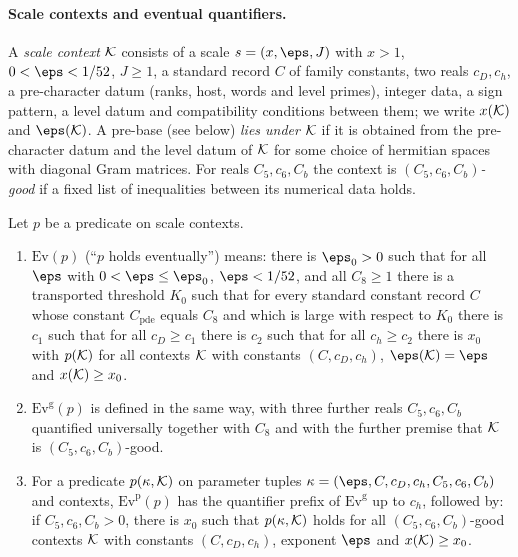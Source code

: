 \paragraph{Scale contexts and eventual quantifiers.}
A \emph{scale context} $\mathcal K$ consists of a scale $s=(x,\eps,J)$ with $x>1$, $0<\eps<1/52$, $J\ge1$, a standard record $C$
of family constants, two reals $c_D,c_h$, a pre-character datum (ranks, host, words and level primes), integer data, a sign
pattern, a level datum and compatibility conditions between them; we write $x(\mathcal K)$ and $\eps(\bundK)$. A pre-base (see
below) \emph{lies under} $\mathcal K$ if it is obtained from the pre-character datum and the level datum of $\mathcal K$ for some
choice of hermitian spaces with diagonal Gram matrices. For reals $C_5,c_6,C_b$ the context is \emph{$(C_5,c_6,C_b)$-good} if
a fixed list of inequalities between its numerical data holds.

\begin{definition}\label{pf:bundles:def:ev}
Let $p$ be a predicate on scale contexts.
\begin{enumerate}[label=(\alph*)]
\item $\mathrm{Ev}(p)$ (``$p$ holds eventually'') means: there is $\eps_0>0$ such that for all $\eps$ with $0<\eps\le\eps_0$,
$\eps<1/52$, and all $C_8\ge1$ there is a transported threshold $K_0$ such that for every standard constant record $C$ whose
constant $C_{\mathrm{pde}}$ equals $C_8$ and which is large with respect to $K_0$ there is $c_1$ such that for all $c_D\ge c_1$
there is $c_2$ such that for all $c_h\ge c_2$ there is $x_0$ with $p(\mathcal K)$ for all contexts $\mathcal K$ with constants
$(C,c_D,c_h)$, $\eps(\bundK)=\eps$ and $x(\mathcal K)\ge x_0$.
\item $\mathrm{Ev}^{\mathrm g}(p)$ is defined in the same way, with three further reals $C_5,c_6,C_b$ quantified universally
together with $C_8$ and with the further premise that $\mathcal K$ is $(C_5,c_6,C_b)$-good.
\item For a predicate $p(\kappa,\mathcal K)$ on parameter tuples $\kappa=(\eps,C,c_D,c_h,C_5,c_6,C_b)$ and contexts,
$\mathrm{Ev}^{\mathrm p}(p)$ has the quantifier prefix of $\mathrm{Ev}^{\mathrm g}$ up to $c_h$, followed by: if
$C_5,c_6,C_b>0$, there is $x_0$ such that $p(\kappa,\mathcal K)$ holds for all $(C_5,c_6,C_b)$-good contexts $\mathcal K$ with
constants $(C,c_D,c_h)$, exponent $\eps$ and $x(\mathcal K)\ge x_0$.
\end{enumerate}
\end{definition}

